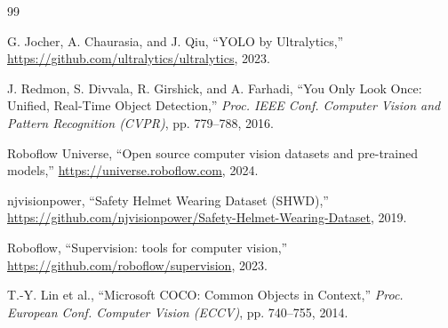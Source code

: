 \documentclass[conference]{IEEEtran}
\begin{document}
\begin{thebibliography}{99}

G. Jocher, A. Chaurasia, and J. Qiu,
``YOLO by Ultralytics,''
\url{https://github.com/ultralytics/ultralytics}, 2023.

J. Redmon, S. Divvala, R. Girshick, and A. Farhadi,
``You Only Look Once: Unified, Real-Time Object Detection,''
\emph{Proc. IEEE Conf. Computer Vision and Pattern Recognition (CVPR)},
pp. 779--788, 2016.

Roboflow Universe,
``Open source computer vision datasets and pre-trained models,''
\url{https://universe.roboflow.com}, 2024.

njvisionpower,
``Safety Helmet Wearing Dataset (SHWD),''
\url{https://github.com/njvisionpower/Safety-Helmet-Wearing-Dataset},
2019.

Roboflow,
``Supervision: tools for computer vision,''
\url{https://github.com/roboflow/supervision}, 2023.

T.-Y. Lin et al.,
``Microsoft COCO: Common Objects in Context,''
\emph{Proc. European Conf. Computer Vision (ECCV)}, pp. 740--755, 2014.

\end{thebibliography}
\end{document}
